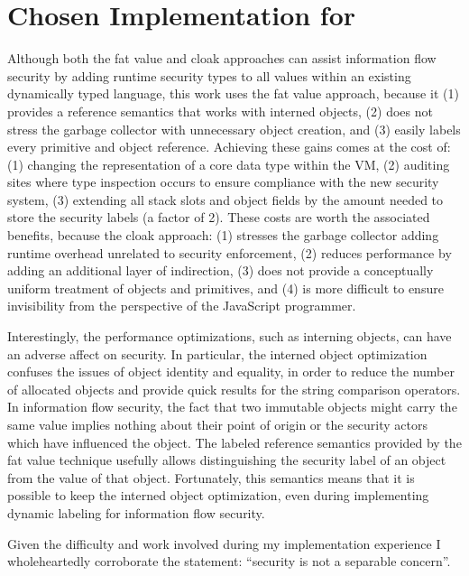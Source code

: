 \section{Chosen Implementation for \FlowCore}\label{sec:conclusion}
\label{sec:chosen-implementation}

Although both the fat value and cloak approaches can assist information flow security by adding runtime security types to all values within an existing dynamically typed language, this work uses the fat value approach, because it
(1) provides a reference semantics that works with interned objects,
(2) does not stress the garbage collector with unnecessary object creation,
and (3) easily labels every primitive and object reference.
Achieving these gains comes at the cost of:
(1) changing the representation of a core data type within the VM,
(2) auditing sites where type inspection occurs to ensure compliance with the new security system,
(3) extending all stack slots and object fields by the amount needed to store the security labels (a factor of 2).
These costs are worth the associated benefits, because the cloak approach:
(1) stresses the garbage collector adding runtime overhead unrelated to security enforcement,
(2) reduces performance by adding an additional layer of indirection,
(3) does not provide a conceptually uniform treatment of objects and primitives,
and (4) is more difficult to ensure invisibility from the perspective of the JavaScript programmer.

Interestingly, the performance optimizations, such as interning  objects, can have an adverse affect on security.
In particular, the interned object optimization confuses the issues of object identity and equality, in order to reduce the number of allocated objects and provide quick results for the string comparison operators.
In information flow security, the fact that two immutable objects might carry the same value implies nothing about their point of origin or the security actors which have influenced the object.
The labeled reference semantics provided by the fat value technique usefully allows distinguishing the security label of an object from the value of that object.
Fortunately, this semantics means that it is possible to keep the interned object optimization, even during implementing dynamic labeling for information flow security.

Given the difficulty and work involved during my implementation experience I wholeheartedly corroborate the statement: ``security is not a separable concern''\cite{miller.etal+04}.


